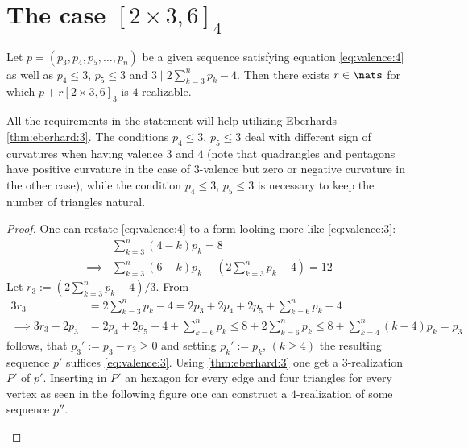 \section{The case $[2 \times 3, 6]_4$}
\begin{lemma}
  Let $p = (p_3, p_4, p_5, \dots, p_n)$ be a given sequence satisfying equation \ref{eq:valence:4} as well as $p_4 \leq 3$, $p_5 \leq 3$ and $3 \mid 2 \sum_{k=3}^{n} p_k - 4$. Then there exists $r \in \nats$ for which $p + r [2 \times 3, 6]_3$ is $4$-realizable.

  All the requirements in the statement will help utilizing Eberhards \ref{thm:eberhard:3}. The conditions $p_4 \leq 3$, $p_5 \leq 3$ deal with different sign of curvatures when having valence $3$ and $4$ (note that quadrangles and pentagons have positive curvature in the case of $3$-valence but zero or negative curvature in the other case), while the condition $p_4 \leq 3$, $p_5 \leq 3$ is necessary to keep the number of triangles natural. 
  \begin{proof}
    One can restate \ref{eq:valence:4} to a form looking more like \ref{eq:valence:3}:
    \begin{align*}
      & \sum_{k=3}^n \left( 4 - k \right) p_k = 8 \\
      \implies & \sum_{k=3}^n \left( 6 - k \right) p_k - \left(2 \sum_{k=3}^n  p_k - 4 \right) = 12
    \end{align*}
    Let $r_3 := (2 \sum_{k=3}^{n} p_k - 4)/3$. From
    \begin{align*}
      3 r_3 &= 2 \sum_{k=3}^{n} p_k - 4 =  2 p_3 + 2 p_4 + 2 p_5 + \sum_{k=6}^{n} p_k - 4\\
      \implies 3 r_3 - 2 p_3 &= 2 p_4 + 2 p_5 - 4 + \sum_{k=6}^{n} p_k \leq 8 + 2 \sum_{k=6}^{n} p_k \leq 8 + \sum_{k=4}^{n} (k - 4) p_k = p_3
    \end{align*}
    follows, that $p_3' := p_3 - r_3 \geq 0$ and setting $p_k' := p_k$, $(k \geq 4)$ the resulting sequence $p'$ suffices \ref{eq:valence:3}. Using \ref{thm:eberhard:3} one get a $3$-realization $P'$ of $p'$. Inserting in $P'$ an hexagon for every edge and four triangles for every vertex as seen in the following figure one can construct a $4$-realization of some sequence $p''$.
    \begin{figure}[htpp]
      \centering
\end{figure}
\end{proof}
\end{lemma}
